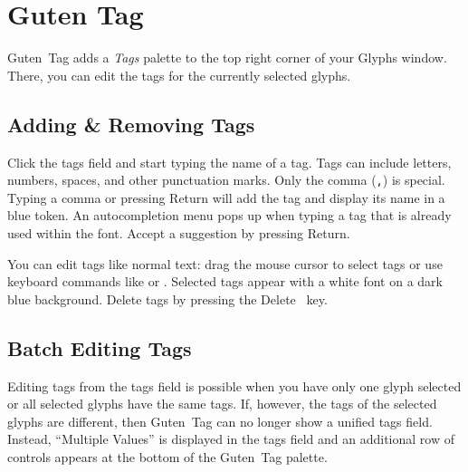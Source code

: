 \chapter{Guten Tag}%
\label{cha:guten_tag}
\BgThispage

\noindent Guten~Tag adds a \emph{Tags} palette to the top right corner of your Glyphs window.
There, you can edit the tags for the currently selected glyphs.

\bigbreak\noindent%
\bigbreak

\section{Adding \& Removing Tags}%
\label{sec:adding_and_removing_tags}

\hfill
{}\hfill
{}

\medbreak\noindent Click the tags field and start typing the name of a tag.
Tags can include letters, numbers, spaces, and other punctuation marks.
Only the comma (\texttt{,}) is special.
Typing a comma or pressing Return will add the tag and display its name in a blue token.
An autocompletion menu pops up when typing a tag that is already used within the font.
Accept a suggestion by pressing Return.

\noindent%
\hfill
{}\hfill
{}\hfill

\medbreak\noindent You can edit tags like normal text: drag the mouse cursor to select tags or use keyboard commands like  or .
Selected tags appear with a white font on a dark blue background.
Delete tags by pressing the Delete~ key.

\section{Batch Editing Tags}%
\label{sec:batch_editing_tags}

Editing tags from the tags field is possible when you have only one glyph selected or all selected glyphs have the same tags.
If, however, the tags of the selected glyphs are different, then Guten~Tag can no longer show a unified tags field.
Instead, \enquote{Multiple Values} is displayed in the tags field and an additional row of controls appears at the bottom of the Guten~Tag palette.

